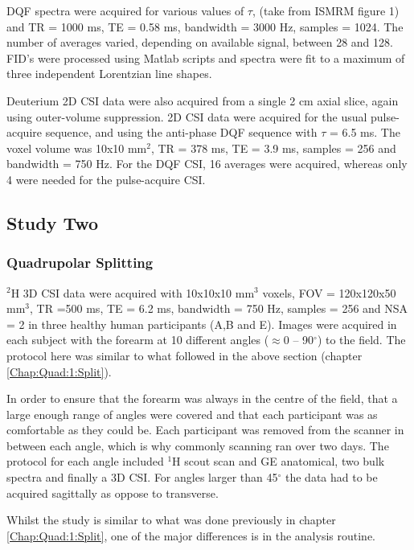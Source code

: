 \documentclass[class=article, crop=false]{standalone}
\begin{document}
DQF spectra were acquired for various values of $\tau$, (take from ISMRM figure 1) and TR = 1000 ms, TE = 0.58 ms, bandwidth = 3000 Hz, samples = 1024. The number of averages varied, depending on available signal, between 28 and 128. FID's were processed using Matlab scripts and spectra were fit to a maximum of three independent Lorentzian line shapes.

Deuterium 2D CSI data were also acquired from a single 2 cm axial slice, again using outer-volume suppression. 2D CSI data were acquired for the usual pulse-acquire sequence, and using the anti-phase DQF sequence with $\tau$ = 6.5 ms. The voxel volume was 10x10 mm$^2$, TR = 378 ms, TE = 3.9 ms, samples = 256 and bandwidth = 750 Hz. For the DQF CSI, 16 averages were acquired, whereas only 4 were needed for the pulse-acquire CSI.

\subsection{Study Two}
\subsubsection{Quadrupolar Splitting}

$^2$H 3D CSI data were acquired with 10x10x10 mm$^3$ voxels, FOV = 120x120x50 mm$^3$, TR =500 ms, TE = 6.2 ms, bandwidth = 750 Hz, samples = 256 and NSA = 2 in three healthy human participants (A,B and E). Images were acquired in each subject with the forearm at 10 different angles ($\approx$0 – 90$^\circ$) to the field. The protocol here was similar to what followed in the above section (chapter \ref{Chap:Quad:1:Split}). 

In order to ensure that the forearm was always in the centre of the field, that a large enough range of angles were covered and that each participant was as comfortable as they could be. Each participant was removed from the scanner in between each angle, which is why commonly scanning ran over two days. The protocol for each angle included $^1$H scout scan and GE anatomical, two bulk spectra and finally a 3D CSI. For angles larger than 45$^\circ$ the data had to be acquired sagittally as oppose to transverse.

Whilst the study is similar to what was done previously in chapter \ref{Chap:Quad:1:Split}, one of the major differences is in the analysis routine. %
\end{document}
